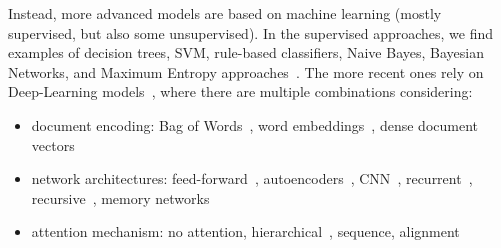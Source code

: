 Instead, more advanced models are based on machine learning (mostly supervised, but also some unsupervised).
In the supervised approaches, we find examples of decision trees, SVM, rule-based classifiers, Naive Bayes, Bayesian Networks, and Maximum Entropy approaches~\citep{zharmagambetov2015sentiment,bayhaqy2018sentiment,fitri2019sentiment,rathi2018sentiment,xie2019improved}.
The more recent ones rely on Deep-Learning models~\citep{zhang2018deep}, where there are multiple combinations considering:
\begin{itemize}
    \item document encoding: Bag of Words~\citep{moraes2013document,zhai2016semisupervised}, word embeddings~\citep{tang2015document,chen2016neural}, dense document vectors~\citep{le2014distributed}
    \item network architectures: feed-forward~\citep{duncan2015neural}, autoencoders~\citep{zhai2016semisupervised,wu2019semi}, CNN~\citep{jianqiang2018deep,sun2019aspect}, recurrent~\citep{chen2017recurrent,xu2016cached}, recursive~\citep{wang2016recursive,nguyen2015phrasernn}, memory networks~\citep{li2017end,lv2021aspect}
    \item attention mechanism: no attention, hierarchical~\citep{zhou2016attention}, sequence, alignment
\end{itemize}




